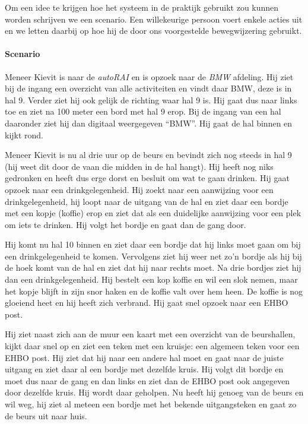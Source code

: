 Om een idee te krijgen hoe het systeem in de praktijk gebruikt zou kunnen worden schrijven we een scenario. Een willekeurige persoon voert enkele acties uit en we letten daarbij op hoe hij de door ons voorgestelde bewegwijzering gebruikt.


\paragraph{Scenario} Meneer Kievit is naar de \emph{autoRAI} en is opzoek naar de \emph{BMW} afdeling. Hij ziet bij de ingang een overzicht van alle activiteiten en vindt daar BMW, deze is in hal 9. Verder ziet hij ook gelijk de richting waar hal 9 is. Hij gaat dus naar links toe en ziet na 100 meter een bord met hal 9 erop. Bij de ingang van een hal daaronder ziet hij dan digitaal weergegeven ``BMW''. Hij gaat de hal binnen en kijkt rond.

Meneer Kievit is nu al drie uur op de beurs en bevindt zich nog steeds in hal 9 (hij weet dit door de vaan die midden in de hal hangt). Hij heeft nog niks gedronken en heeft dus erge dorst en besluit om wat te gaan drinken. Hij gaat opzoek naar een drinkgelegenheid. Hij zoekt naar een aanwijzing voor een drinkgelegenheid, hij loopt naar de uitgang van de hal en ziet daar een bordje met een kopje (koffie) erop en ziet dat als een duidelijke aanwijzing voor een plek om iets te drinken. Hij volgt het bordje en gaat dan de gang door.

Hij komt nu hal 10 binnen en ziet daar een bordje dat hij links moet gaan om bij een drinkgelegenheid te komen. Vervolgens ziet hij weer net zo'n bordje als hij bij de hoek komt van de hal en ziet dat hij naar rechts moet. Na drie bordjes ziet hij dan een drinkgelegenheid. Hij bestelt een kop koffie en wil een slok nemen, maar het kopje blijft in zijn snor haken en de koffie valt over hem heen. De koffie is nog gloeiend heet en hij heeft zich verbrand. Hij gaat snel opzoek naar een EHBO post.

Hij ziet naast zich aan de muur een kaart met een overzicht van de beurshallen, kijkt daar snel op en ziet een teken met een kruisje: een algemeen teken voor een EHBO post. Hij ziet dat hij naar een andere hal moet en gaat naar de juiste uitgang en ziet daar al een bordje met dezelfde kruis. Hij volgt dit bordje en moet dus naar de gang en dan links en ziet dan de EHBO post ook angegeven door dezelfde kruis. Hij wordt daar geholpen. Nu heeft hij genoeg van de beurs en wil weg, hij ziet al meteen een bordje met het bekende uitgangsteken en gaat zo de beurs uit naar huis.


